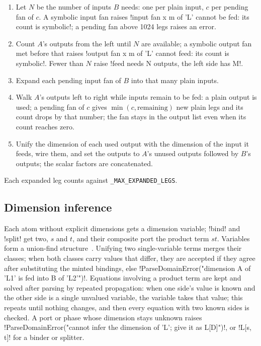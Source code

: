 \begin{algorithm}\label{alg:language-compose}
\leavevmode
\begin{enumerate}
\item Let $N$ be the number of inputs $B$ needs: one per plain input, $c$ per pending fan of $c$. A symbolic input fan raises \code!input fan x m of 'L' cannot be fed: its count is symbolic!; a pending fan above 1024 legs raises an error.
\item Count $A$'s outputs from the left until $N$ are available; a symbolic output fan met before that raises \code!output fan x m of 'L' cannot feed: its count is symbolic!. Fewer than $N$ raise \code!feed needs N outputs, the left side has M!.
\item Expand each pending input fan of $B$ into that many plain inputs.
\item Walk $A$'s outputs left to right while inputs remain to be fed: a plain output is used; a pending fan of $c$ gives $\min(c,\text{remaining})$ new plain legs and its count drops by that number; the fan stays in the output list even when its count reaches zero.
\item Unify the dimension of each used output with the dimension of the input it feeds, wire them, and set the outputs to $A$'s unused outputs followed by $B$'s outputs; the scalar factors are concatenated.
\end{enumerate}
Each expanded leg counts against \texttt{\_MAX\_EXPANDED\_LEGS}.
\end{algorithm}

\subsection{Dimension inference}\label{sec:language-dirac-dims}

Each atom without explicit dimensions gets a dimension variable; \code!bind! and \code!split! get two, $s$ and $t$, and their composite port the product term $st$. Variables form a union-find structure~\cite{tarjan1975unionfind}. Unifying two single-variable terms merges their classes; when both classes carry values that differ, they are accepted if they agree after substituting the minted bindings, else \code!ParseDomainError("dimension A of 'L1' is fed into B of 'L2'")!. Equations involving a product term are kept and solved after parsing by repeated propagation: when one side's value is known and the other side is a single unvalued variable, the variable takes that value; this repeats until nothing changes, and then every equation with two known sides is checked. A port or phase whose dimension stays unknown raises \code!ParseDomainError("cannot infer the dimension of 'L'; give it as L[D]")!, or \code!L[s, t]! for a binder or splitter.

